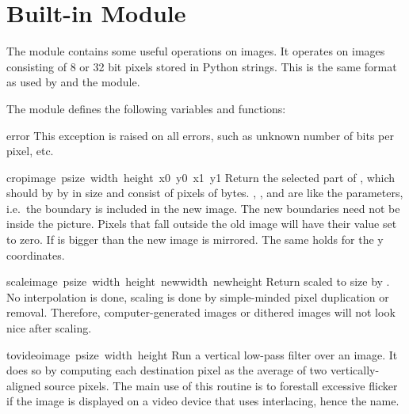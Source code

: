 \section{Built-in Module }
\label{module-imageop}

The  module contains some useful operations on images.
It operates on images consisting of 8 or 32 bit pixels
stored in Python strings.  This is the same format as used
by  and the  module.

The module defines the following variables and functions:

\renewcommand{\indexsubitem}{(in module imageop)}

\begin{excdesc}{error}
This exception is raised on all errors, such as unknown number of bits
per pixel, etc.
\end{excdesc}


\begin{funcdesc}{crop}{image\, psize\, width\, height\, x0\, y0\, x1\, y1}
Return the selected part of , which should by
 by  in size and consist of pixels of
 bytes. , ,  and  are like
the  parameters, i.e.\ the boundary is included in the
new image.  The new boundaries need not be inside the picture.  Pixels
that fall outside the old image will have their value set to zero.  If
 is bigger than  the new image is mirrored.  The same
holds for the y coordinates.
\end{funcdesc}

\begin{funcdesc}{scale}{image\, psize\, width\, height\, newwidth\, newheight}
Return  scaled to size  by .
No interpolation is done, scaling is done by simple-minded pixel
duplication or removal.  Therefore, computer-generated images or
dithered images will not look nice after scaling.
\end{funcdesc}

\begin{funcdesc}{tovideo}{image\, psize\, width\, height}
Run a vertical low-pass filter over an image.  It does so by computing
each destination pixel as the average of two vertically-aligned source
pixels.  The main use of this routine is to forestall excessive
flicker if the image is displayed on a video device that uses
interlacing, hence the name.
\end{funcdesc}

